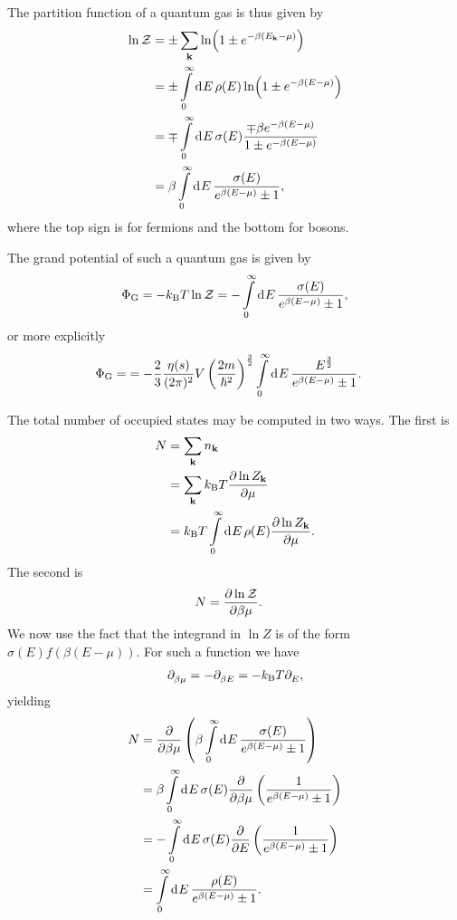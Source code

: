 The partition function of a quantum gas is thus given by
\begin{align*}
	\ln{\mathcal{Z}} &= \pm\sum\limits_{\vb{k}}\ln(1 \pm e^{-\beta(E_{\vb{k}} - \mu)}) \\
	        &= \pm\int\limits_{0}^{\infty}\dd[]{E}\rho(E)\ln(1 \pm e^{-\beta(E - \mu)}) \\
	        &= \mp\int\limits_{0}^{\infty}\dd[]{E}\sigma(E)\frac{\mp\beta e^{-\beta(E - \mu)}}{1 \pm e^{-\beta(E - \mu)}} \\
	        &= \beta\int\limits_{0}^{\infty}\dd[]{E}\frac{\sigma(E)}{e^{\beta(E - \mu)} \pm 1},
\end{align*}
where the top sign is for fermions and the bottom for bosons.

The grand potential of such a quantum gas is given by
\begin{align*}
	\Phi_{\text{G}} = -k_{\text{B}} T\ln{\mathcal{Z}} = -\int\limits_{0}^{\infty}\dd[]{E}\frac{\sigma(E)}{e^{\beta(E - \mu)} \pm 1},
\end{align*}
or more explicitly
\begin{align*}
	\Phi_{\text{G}} = &=  -\frac{2}{3}\frac{\eta(s)}{(2\pi)^{2}}V\left(\frac{2m}{\hbar^{2}}\right)^{\frac{3}{2}}\int\limits_{0}^{\infty}\dd[]{E}\frac{E^{\frac{3}{2}}}{e^{\beta(E - \mu)} \pm 1}.
\end{align*}

The total number of occupied states may be computed in two ways. The first is
\begin{align*}
	N &= \sum\limits_{\vb{k}}n_{\vb{k}} \\
	  &= \sum\limits_{\vb{k}}k_{\text{B}} T\pdv{\ln{Z_{\vb{k}}}}{\mu} \\
	  &= k_{\text{B}} T\int\limits_{0}^{\infty}\dd[]{E}\rho(E)\pdv{\ln{Z_{\vb{k}}}}{\mu}.
\end{align*}
The second is
\begin{align*}
	N &= \pdv{\ln{\mathcal{Z}}}{\beta\mu}.
\end{align*}
We now use the fact that the integrand in $\ln{Z}$ is of the form $\sigma(E)f(\beta(E - \mu))$. For such a function we have
\begin{align*}
	\partial_{\beta\mu}^{} = -\partial_{\beta E}^{} = -k_{\text{B}} T\partial_{E}^{},
\end{align*}
yielding
\begin{align*}
	N &= \pdv{\beta\mu}\left(\beta\int\limits_{0}^{\infty}\dd[]{E}\frac{\sigma(E)}{e^{\beta(E - \mu)} \pm 1}\right) \\
	  &= \beta\int\limits_{0}^{\infty}\dd[]{E}\sigma(E)\pdv{\beta\mu}\left(\frac{1}{e^{\beta(E - \mu)} \pm 1}\right) \\
	  &= -\int\limits_{0}^{\infty}\dd[]{E}\sigma(E)\pdv{E}\left(\frac{1}{e^{\beta(E - \mu)} \pm 1}\right) \\
	  &= \int\limits_{0}^{\infty}\dd[]{E}\frac{\rho(E)}{e^{\beta(E - \mu)} \pm 1}.
\end{align*}

